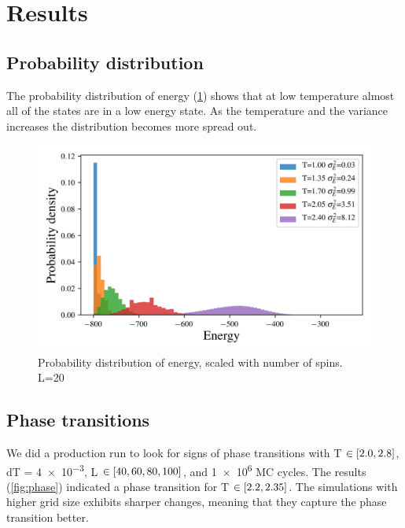 \section{Results}




\subsection{Probability distribution}

The probability distribution of energy (\cref{fig:distribution}) shows that
at low temperature almost all of the states are in a low energy state.
As the temperature and the variance increases the distribution becomes more
spread out.

\begin{figure}[H]
  \centering
  \includegraphics[width=\textwidth]{../figures/distribution.png}
  \caption{Probability distribution of energy, scaled with number of spins. L=20}
  \label{fig:distribution}
\end{figure}


\subsection{Phase transitions}

We did a production run to look for signs of phase transitions with T $\in
\left[2.0,2.8\right]$, dT = \num{4e-3}, L $\in \left[40,60,80,100\right]$, and \num{1e6} MC
cycles.
The results (\cref{fig:phase}) indicated a phase transition for T $\in
\left[2.2,2.35\right]$. The simulations with higher grid size exhibits sharper
changes, meaning that they capture the phase transition better.


